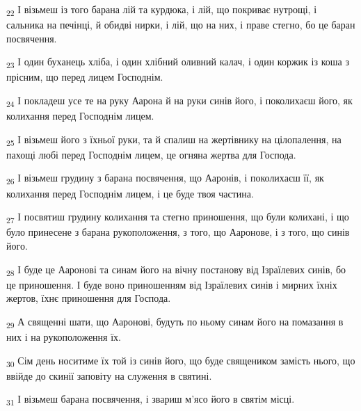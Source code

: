 \begin{tcolorbox}
\textsubscript{22} І візьмеш із того барана лій та курдюка, і лій, що покриває нутрощі, і сальника на печінці, й обидві нирки, і лій, що на них, і праве стегно, бо це баран посвячення.
\end{tcolorbox}
\begin{tcolorbox}
\textsubscript{23} І один буханець хліба, і один хлібний оливний калач, і один коржик із коша з прісним, що перед лицем Господнім.
\end{tcolorbox}
\begin{tcolorbox}
\textsubscript{24} І покладеш усе те на руку Аарона й на руки синів його, і поколихаєш його, як колихання перед Господнім лицем.
\end{tcolorbox}
\begin{tcolorbox}
\textsubscript{25} І візьмеш його з їхньої руки, та й спалиш на жертівнику на цілопалення, на пахощі любі перед Господнім лицем, це огняна жертва для Господа.
\end{tcolorbox}
\begin{tcolorbox}
\textsubscript{26} І візьмеш грудину з барана посвячення, що Ааронів, і поколихаєш її, як колихання перед Господнім лицем, і це буде твоя частина.
\end{tcolorbox}
\begin{tcolorbox}
\textsubscript{27} І посвятиш грудину колихання та стегно приношення, що були колихані, і що було принесене з барана рукоположення, з того, що Ааронове, і з того, що синів його.
\end{tcolorbox}
\begin{tcolorbox}
\textsubscript{28} І буде це Ааронові та синам його на вічну постанову від Ізраїлевих синів, бо це приношення. І буде воно приношенням від Ізраїлевих синів і мирних їхніх жертов, їхнє приношення для Господа.
\end{tcolorbox}
\begin{tcolorbox}
\textsubscript{29} А священні шати, що Ааронові, будуть по ньому синам його на помазання в них і на рукоположення їх.
\end{tcolorbox}
\begin{tcolorbox}
\textsubscript{30} Сім день носитиме їх той із синів його, що буде священиком замість нього, що ввійде до скинії заповіту на служення в святині.
\end{tcolorbox}
\begin{tcolorbox}
\textsubscript{31} І візьмеш барана посвячення, і звариш м'ясо його в святім місці.
\end{tcolorbox}
